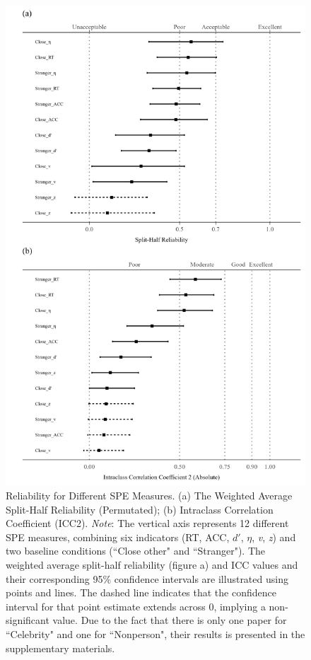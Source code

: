 \documentclass[sn-apa]{sn-jnl}%
\theoremstyle{thmstyleone}%
\theoremstyle{thmstyletwo}%
\theoremstyle{thmstylethree}%
\begin{document}
\begin{figure}[!htbp]
	\centering
	\includegraphics[width=1\textwidth]{./Figure/Fig_4_shr_icc.png}
	\caption{ Reliability for Different SPE Measures. (a) The Weighted Average Split-Half Reliability (Permutated); (b) Intraclass Correlation Coefficient (ICC2). \textit{Note}: The vertical axis represents 12 different SPE measures, combining six indicators (RT, ACC, $d'$, $\eta$, \textit{v}, \textit{z}) and two baseline conditions (``Close other" and ``Stranger"). The weighted average split-half reliability (figure a) and ICC values and their corresponding 95\% confidence intervals are illustrated using points and lines. The dashed line indicates that the confidence interval for that point estimate extends across 0, implying a non-significant value. Due to the fact that there is only one paper for ``Celebrity" and one for ``Nonperson", their results is presented in the supplementary materials.
	}
	\label{fig:shr_icc}
\end{figure}
\end{document}
